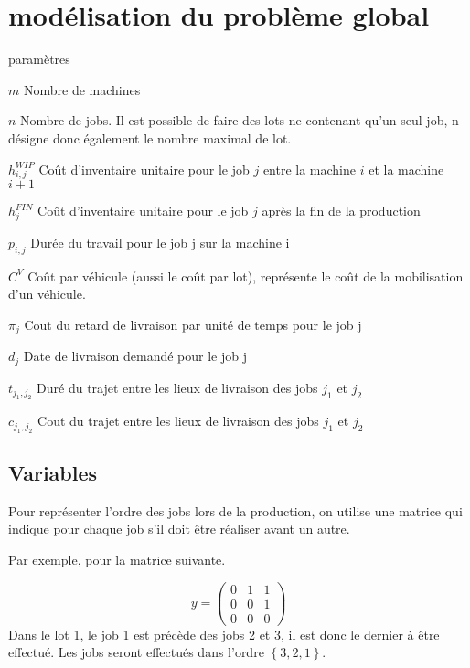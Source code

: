 \chapter{modélisation du problème global}
\label{appendix:modelisation_global}

\begin{labeling}{paramètres}

	\item [$m$]
	Nombre de machines
	\item [$n$]
	Nombre de jobs.
	Il est possible de faire des lots ne contenant qu’un seul job,
	n désigne donc également le nombre maximal de lot.
	\item [$h_{i,j}^{WIP}$]
	Coût d’inventaire unitaire pour le job $j$ entre la machine $i$ et la machine $i+1$
	\item [$h_j^{FIN}$]
	Coût d’inventaire unitaire pour le job $j$ après la fin de la production
	\item [$p_{i,j}$]
	Durée du travail pour le job j sur la machine i
	\item [$C^V$]
	Coût par véhicule (aussi le coût par lot), représente le coût de la mobilisation d’un véhicule.
	\item [$\pi_j$]
	Cout du retard de livraison par unité de temps pour le job j
	\item [$d_j$]
	Date de livraison demandé pour le job j
	\item [$t_{j_1,j_2}$]
	Duré du trajet entre les lieux de livraison des jobs $j_1$ et $j_2$
	\item [$c_{j_1,j_2}$]
	Cout du trajet entre les lieux de livraison des jobs $j_1$ et $j_2$
\end{labeling}


\section*{Variables}

Pour représenter l’ordre des jobs lors de la production, on utilise une matrice qui indique pour chaque job s’il doit être réaliser avant un autre.

Par exemple, pour la matrice suivante.

$$
	y=
	\begin{pmatrix}
		0 & 1 & 1 \\
		0 & 0 & 1 \\
		0 & 0 & 0
	\end{pmatrix}
$$
Dans le lot 1, le job 1 est précède des jobs 2 et 3, il est donc le dernier à être effectué. Les jobs seront effectués dans l’ordre $\left\{3,2,1\right\}$.

